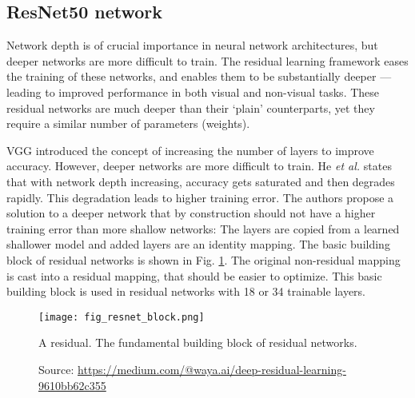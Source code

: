 
\subsection{ResNet50 network}
Network depth is of crucial importance in neural network architectures, but deeper networks are more difficult to train. The residual learning framework eases the training of these networks, and enables them to be substantially deeper — leading to improved performance in both visual and non-visual tasks. These residual networks are much deeper than their ‘plain’ counterparts, yet they require a similar number of parameters (weights).

VGG introduced the concept of increasing the number of layers to improve accuracy. However, deeper networks are more difficult to train. He \textit{et al.} \cite{he2016deep} states that with network depth increasing, accuracy gets saturated and then degrades rapidly. This degradation leads to higher training error. The authors propose a solution to a deeper network that by construction should not have a higher training error than more shallow networks: The layers are copied from a learned shallower model and added layers are an identity mapping. The basic building block of residual networks is shown in Fig. \ref{fig:resnet_block}. The original non-residual mapping is cast into a residual mapping, that should be easier to optimize. This basic building block is used in residual networks with 18 or 34 trainable layers. 
\begin{figure}[ht]
    \begin{center}       
    \texttt{[image: fig\_resnet\_block.png]}
    \caption[Residual block]{A residual. The fundamental building block of residual networks.}
    \caption*{Source: \href{https://medium.com/@waya.ai/deep-residual-learning-9610bb62c355}{https://medium.com/@waya.ai/deep-residual-learning-9610bb62c355}}
    \label{fig:resnet_block}
    \end{center}
\end{figure}

